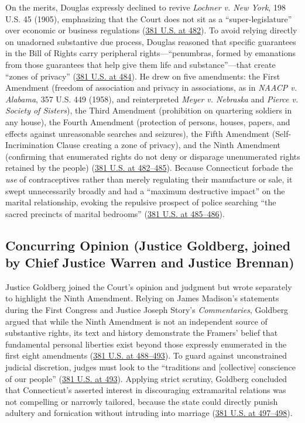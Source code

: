 \documentclass[12pt]{article}
\begin{document}
On the merits, Douglas expressly declined to revive \textit{Lochner v. New York}, 198 U.S. 45 (1905), emphasizing that the Court does not sit as a ``super-legislature'' over economic or business regulations (\href{https://supreme.justia.com/cases/federal/us/381/479/}{381 U.S. at 482}). To avoid relying directly on unadorned substantive due process, Douglas reasoned that specific guarantees in the Bill of Rights carry peripheral rights---``penumbras, formed by emanations from those guarantees that help give them life and substance''---that create ``zones of privacy'' (\href{https://supreme.justia.com/cases/federal/us/381/479/}{381 U.S. at 484}). He drew on five amendments: the First Amendment (freedom of association and privacy in associations, as in \textit{NAACP v. Alabama}, 357 U.S. 449 (1958), and reinterpreted \textit{Meyer v. Nebraska} and \textit{Pierce v. Society of Sisters}), the Third Amendment (prohibition on quartering soldiers in any house), the Fourth Amendment (protection of persons, houses, papers, and effects against unreasonable searches and seizures), the Fifth Amendment (Self-Incrimination Clause creating a zone of privacy), and the Ninth Amendment (confirming that enumerated rights do not deny or disparage unenumerated rights retained by the people) (\href{https://supreme.justia.com/cases/federal/us/381/479/}{381 U.S. at 482--485}). Because Connecticut forbade the \textit{use} of contraceptives rather than merely regulating their manufacture or sale, it swept unnecessarily broadly and had a ``maximum destructive impact'' on the marital relationship, evoking the repulsive prospect of police searching ``the sacred precincts of marital bedrooms'' (\href{https://supreme.justia.com/cases/federal/us/381/479/}{381 U.S. at 485--486}).

\subsection{Concurring Opinion (Justice Goldberg, joined by Chief Justice Warren and Justice Brennan)}
Justice Goldberg joined the Court's opinion and judgment but wrote separately to highlight the Ninth Amendment. Relying on James Madison's statements during the First Congress and Justice Joseph Story's \textit{Commentaries}, Goldberg argued that while the Ninth Amendment is not an independent source of substantive rights, its text and history demonstrate the Framers' belief that fundamental personal liberties exist beyond those expressly enumerated in the first eight amendments (\href{https://supreme.justia.com/cases/federal/us/381/479/}{381 U.S. at 488--493}). To guard against unconstrained judicial discretion, judges must look to the ``traditions and [collective] conscience of our people'' (\href{https://supreme.justia.com/cases/federal/us/381/479/}{381 U.S. at 493}). Applying strict scrutiny, Goldberg concluded that Connecticut's asserted interest in discouraging extramarital relations was not compelling or narrowly tailored, because the state could directly punish adultery and fornication without intruding into marriage (\href{https://supreme.justia.com/cases/federal/us/381/479/}{381 U.S. at 497--498}).
\end{document}
